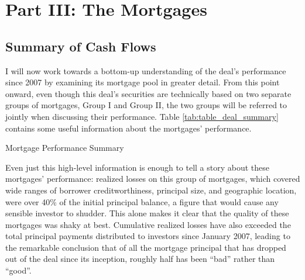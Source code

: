 \documentclass[12pt]{article}
\begin{document}
\section*{Part III: The Mortgages}
\subsection*{Summary of Cash Flows}

I will now work towards a bottom-up understanding of the deal's performance since 2007 by examining its mortgage pool in greater detail. From this point onward, even though this deal’s securities are technically based on two separate groups of mortgages, Group I and Group II, the two groups will be referred to jointly when discussing their performance. Table \ref{tab:table_deal_summary} contains some useful information about the mortgages’ performance.

\begin{table}[h]
	\centering
	\caption{Mortgage Performance Summary}
	
	
	\label{tab:table_deal_summary}
\end{table}

Even just this high-level information is enough to tell a story about these mortgages’ performance: realized losses on this group of mortgages, which covered wide ranges of borrower creditworthiness, principal size, and geographic location, were over 40\% of the initial principal balance, a figure that would cause any sensible investor to shudder. This alone makes it clear that the quality of these mortgages was shaky at best. Cumulative realized losses have also exceeded the total principal payments distributed to investors since January 2007, leading to the remarkable conclusion that of all the mortgage principal that has dropped out of the deal since its inception, roughly half has been “bad” rather than “good”.
\end{document}

